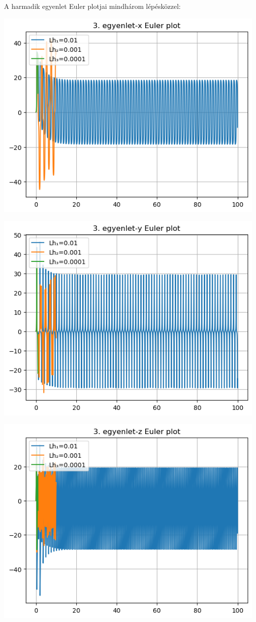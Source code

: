 \documentclass{article}
\begin{document}
A harmadik egyenlet Euler plotjai mindhárom lépésközzel:

\includegraphics[scale=1]{../plot_5.png} 

\includegraphics[scale=1]{../plot_7.png} 

\includegraphics[scale=1]{../plot_8.png} 
\end{document}
